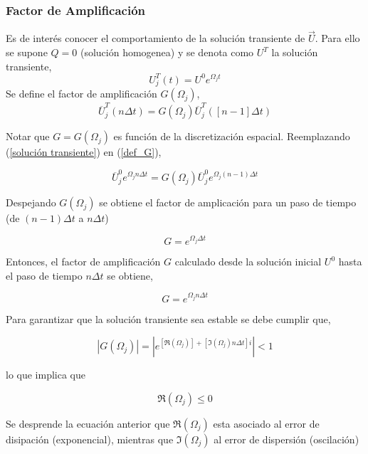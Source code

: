 \subsubsection{Factor de Amplificación}

Es de interés conocer el comportamiento de la solución transiente de $\vec{U}$. Para ello se supone $Q=0$ (solución homogenea) y se denota como $U^T$ la solución transiente,
\begin{equation} \label{solución transiente}
U_j^T(t) = U^0 e^{\Omega_jt}
\end{equation}
Se define el factor de amplificación $G(\Omega_j)$,
\begin{equation} \label{def_G}
\overline{U}_j^T (n \Delta t) = G(\Omega_j) \overline{U}_j^T \left( \left[ n-1 \right] \Delta t \right)
\end{equation}

Notar que $G = G(\Omega_j)$ es función de la discretización espacial. Reemplazando (\ref{solución transiente}) en (\ref{def_G}),

\begin{equation}
\overline{U}_j^0 e^{\Omega_j n \Delta t} = G(\Omega_j) \overline{U}_j^0 e^{\Omega_j (n-1) \Delta t}
\end{equation}

Despejando $G(\Omega_j)$ se obtiene el factor de amplicación para un paso de tiempo (de $ (n-1) \Delta t$ a $n \Delta t$)

\begin{equation}
G = e^{\Omega_j \Delta t}
\end{equation}

Entonces, el factor de amplificación $G$ calculado desde la solución inicial $U^0$ hasta el paso de tiempo $n \Delta t$ se obtiene,

\begin{equation}
G = e^{\Omega_j n \Delta t}
\end{equation}

Para garantizar que la solución transiente sea estable se debe cumplir que,

\begin{equation} \label{convg_1}
| G(\Omega_j) | = | e^{ \left[ \Re(\Omega_j) \right] + \left[ \Im(\Omega_j) n \Delta t \right] i} | < 1
\end{equation}

lo que implica que

\begin{equation} \label{convg_2}
\Re(\Omega_j) \leq 0
\end{equation}

Se desprende la ecuación anterior que $\Re(\Omega_j)$ esta asociado al error de disipación (exponencial), mientras que $\Im(\Omega_j)$ al error de dispersión (oscilación)

